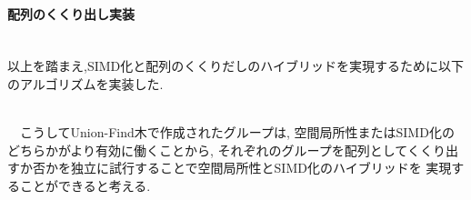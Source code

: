 \paragraph{配列のくくり出し実装}~\\

以上を踏まえ,SIMD化と配列のくくりだしのハイブリッドを実現するために以下のアルゴリズムを実装した.\\

{\footnotesize

}~\\
　こうしてUnion-Find木で作成されたグループは, 空間局所性またはSIMD化のどちらかがより有効に働くことから,
それぞれのグループを配列としてくくり出すか否かを独立に試行することで空間局所性とSIMD化のハイブリッドを
実現することができると考える.\\
